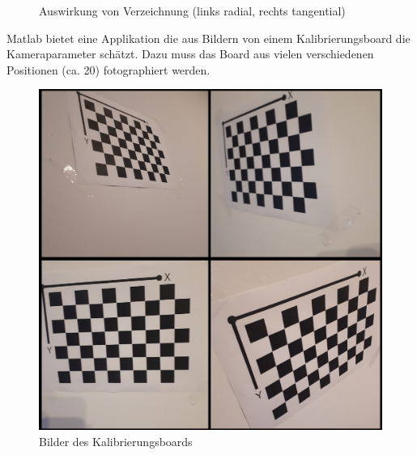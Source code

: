 \begin{figure}[ht]
\centering
    \caption{Auswirkung von Verzeichnung (links radial, rechts tangential) \cite{Verlag}}
\end{figure}

Matlab bietet eine Applikation die aus Bildern von einem Kalibrierungsboard die Kameraparameter schätzt. Dazu muss das Board aus vielen verschiedenen Positionen (ca. 20) fotographiert werden. 
\begin{figure}[ht]
    \centering
    \includegraphics[scale=0.05]{Figures/Kalib1.jpg}
    \caption{Bilder des Kalibrierungsboards}
\end{figure}

